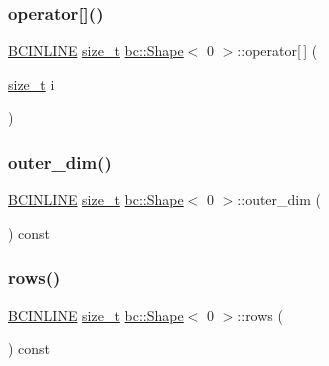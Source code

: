 \mbox{\label{structbc_1_1Shape_3_010_01_4_a9faf1294202a6584267a08306504d304}} 
\subsubsection{\texorpdfstring{operator[]()}{operator[]()}}
{\footnotesize\ttfamily \hyperlink{common_8h_a6699e8b0449da5c0fafb878e59c1d4b1}{B\+C\+I\+N\+L\+I\+NE} \hyperlink{structbc_1_1Shape_3_010_01_4_a7bf4db55cfc575f40871044048ea5c03}{size\+\_\+t} \hyperlink{structbc_1_1Shape}{bc\+::\+Shape}$<$ 0 $>$\+::operator\mbox{[}$\,$\mbox{]} (\begin{DoxyParamCaption}\item[{\hyperlink{structbc_1_1Shape_3_010_01_4_a7bf4db55cfc575f40871044048ea5c03}{size\+\_\+t}}]{i }\end{DoxyParamCaption})\hspace{0.3cm}{\ttfamily [inline]}}

\mbox{\label{structbc_1_1Shape_3_010_01_4_a18118f9b140b3b87cd58ef8701573f47}} 
\subsubsection{\texorpdfstring{outer\+\_\+dim()}{outer\_dim()}}
{\footnotesize\ttfamily \hyperlink{common_8h_a6699e8b0449da5c0fafb878e59c1d4b1}{B\+C\+I\+N\+L\+I\+NE} \hyperlink{structbc_1_1Shape_3_010_01_4_a7bf4db55cfc575f40871044048ea5c03}{size\+\_\+t} \hyperlink{structbc_1_1Shape}{bc\+::\+Shape}$<$ 0 $>$\+::outer\+\_\+dim (\begin{DoxyParamCaption}{ }\end{DoxyParamCaption}) const\hspace{0.3cm}{\ttfamily [inline]}}

\mbox{\label{structbc_1_1Shape_3_010_01_4_aa9fb88985aa21d63d45719dc8f1f2d63}} 
\subsubsection{\texorpdfstring{rows()}{rows()}}
{\footnotesize\ttfamily \hyperlink{common_8h_a6699e8b0449da5c0fafb878e59c1d4b1}{B\+C\+I\+N\+L\+I\+NE} \hyperlink{structbc_1_1Shape_3_010_01_4_a7bf4db55cfc575f40871044048ea5c03}{size\+\_\+t} \hyperlink{structbc_1_1Shape}{bc\+::\+Shape}$<$ 0 $>$\+::rows (\begin{DoxyParamCaption}{ }\end{DoxyParamCaption}) const\hspace{0.3cm}{\ttfamily [inline]}}

